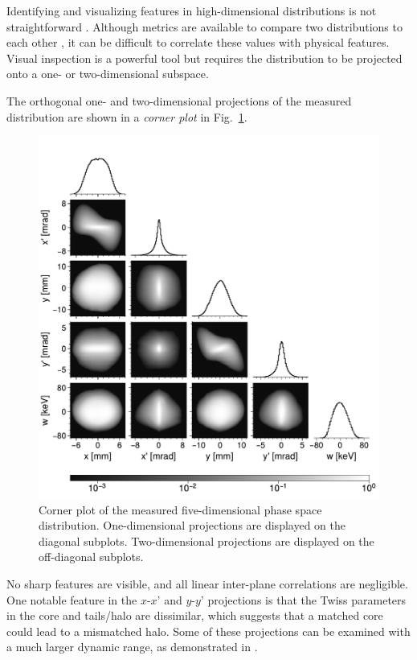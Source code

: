 \documentclass[%
 reprint,
 amsmath,amssymb,
 aps,
prstab,
]{revtex4-2}
\begin{document}
Identifying and visualizing features in high-dimensional distributions is not straightforward \cite{Liu2017}. Although metrics are available to compare two distributions to each other \cite{Loudin2003, Modarres2020, Wong2022-symmetry, Wong2022-tomography, Mitchell2022}, it can be difficult to correlate these values with physical features. Visual inspection is a powerful tool but requires the distribution to be projected onto a one- or two-dimensional subspace.

The orthogonal one- and two-dimensional projections of the measured distribution are shown in a \textit{corner plot} in Fig.~\ref{fig:corner}.
%
\begin{figure}[]
    \centering
    \includegraphics[width=1.0\columnwidth]{fig_corner.pdf}
    \caption{Corner plot of the measured five-dimensional phase space distribution. One-dimensional projections are displayed on the diagonal subplots. Two-dimensional projections are displayed on the off-diagonal subplots.}
    \label{fig:corner}
\end{figure}
%
No sharp features are visible, and all linear inter-plane correlations are negligible. One notable feature in the $x$-$x’$ and $y$-$y’$ projections is that the Twiss parameters in the core and tails/halo are dissimilar, which suggests that a matched core could lead to a mismatched halo. Some of these projections can be examined with a much larger dynamic range, as demonstrated in \cite{Aleksandrov2021}.
\end{document}
